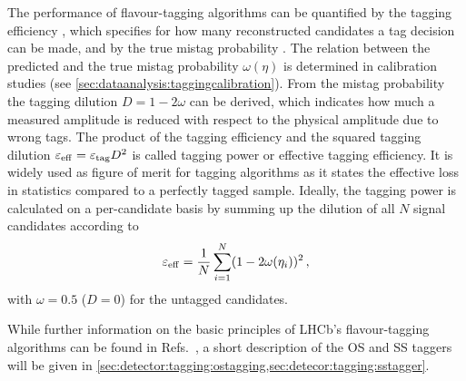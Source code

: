 The performance of flavour-tagging algorithms can be quantified by the tagging
efficiency \etag, which specifies for how many reconstructed candidates a tag
decision can be made, and by the true mistag probability \mistag. The relation
between the predicted and the true mistag probability $\omega(\eta)$ is
determined in calibration studies (see
\cref{sec:dataanalysis:taggingcalibration}). From the mistag probability the
tagging dilution $D = 1 - 2\omega$ can be derived, which indicates how much a
measured amplitude is reduced with respect to the physical amplitude due to
wrong tags. The product of the tagging efficiency and the squared tagging
dilution $\varepsilon_{\mathrm{eff}} = {\varepsilon_{\mathrm{tag}}} D^2$ is called tagging power or effective tagging
efficiency. It is widely used as figure of merit for tagging algorithms as it
states the effective loss in statistics compared to a perfectly tagged sample.
Ideally, the tagging power is calculated on a per-candidate basis by summing
up the dilution of all $N$ signal candidates according to
\begin{equation}
	\varepsilon_{\mathrm{eff}} = \frac{1}{N}\sum_{i=1}^{N} (1 - 2\omega(\eta_i))^2\,,
\label{eq:detector:tagging:taggingpowerperevent}
\end{equation}
with $\omega = 0.5$ ($D=0$) for the untagged candidates.

While further information on the basic principles of LHCb's flavour-tagging
algorithms can be found in Refs.~\cite{LHCb-CONF-2011-003,Grabalosa:1456804},
a short description of the OS and SS taggers will be given in
\cref{sec:detector:tagging:ostagging,sec:detecor:tagging:sstagger}.



